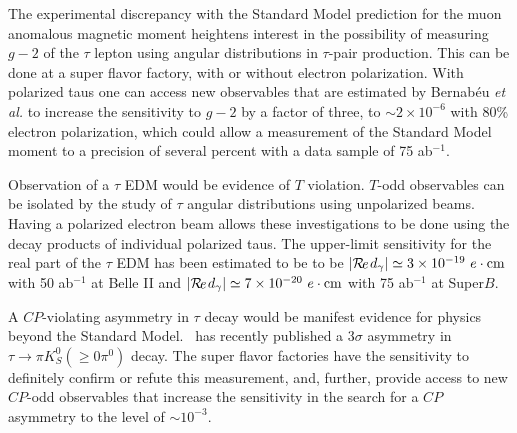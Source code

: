 The experimental discrepancy with the Standard Model prediction for
the muon anomalous magnetic moment heightens interest in the
possibility of measuring $g-2$ of the $\tau$ lepton using angular
distributions in $\tau$-pair production. This can be done at a super flavor factory, with or without electron polarization.  With polarized taus one can access new observables that are estimated by
Bernab\'eu {\it et al.}\cite{ref:b1} to increase the sensitivity to
$g-2$ by a factor of three, to $\sim2\times 10^{-6}$ with 80\%
electron polarization, which could allow a measurement of the Standard
Model moment to a precision of several percent with a data sample of
75 ab$^{-1}$.

Observation of a $\tau$ EDM would be evidence of $T$ violation.  $T$-odd observables can be isolated by the study of $\tau$ angular
distributions using unpolarized beams. Having a polarized electron
beam allows these investigations to be done using the decay products
of individual polarized taus.  The upper-limit sensitivity for the real part of the
$\tau$ EDM has been estimated to be to be $|\Re{d_\gamma}|\simeq 3\times 10^{-19} \ e \cdot {\rm cm}$
with 50 ab$^{-1 }$ at Belle II and $|\Re{d_\gamma}|\simeq 7\times 10^{-20} \ e \cdot {\rm cm}$
with 75 ab$^{-1 }$ at Super$B$\cite{ref:b2}.

A $C\!P$-violating asymmetry in $\tau$ decay would be manifest evidence
for physics beyond the Standard Model. \babar\ has recently published
a 3$\sigma$ asymmetry in $\tau\to\pi K_S^0(\ge 0\pi^0)$
decay\cite{ref:taucp}. The super flavor factories have the sensitivity to
definitely confirm or refute this measurement, and, further, provide
access to new $C\!P$-odd observables that increase the sensitivity in the
search for a $C\!P$ asymmetry to the level of $\sim 10^{-3}$.
